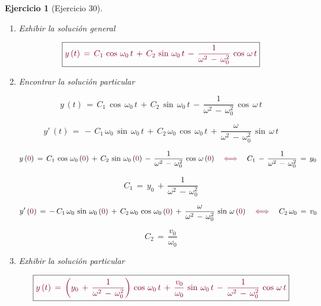 \documentclass[a4paper,11pt, openany]{book}
\newtheorem{ejer}{Ejercicio}[section]
\newcommand*{\itembolasazules}[1]{%
\footnotesize\protect\tikz[baseline=-3pt]%
\protect\node[scale=.7, circle, shade, ball
color=green]{\color{white}\Large\bf#1};}
\begin{document}
\begin{ejer}[Ejercicio 30]
\begin{enumerate}[label=\itembolasazules{\arabic*}]
\item Exhibir la solución general
 
$$\boxed{\textcolor{burgundy}{y\,(t)\,=\,C_{1}\,\cos\,\omega_{0}\,t\,+\,C_{2}\,\sin\,\omega_{0}\,t\,-\,\dfrac{1}{\omega^{2}\,-\,\omega_{0}^{2}}\,\cos\,\omega\,t }} $$
 
\item Encontrar la solución particular
 
$$y\,(t)\,=\,C_{1}\,\cos\,\omega_{0}\,t\,+\,C_{2}\,\sin\,\omega_{0}\,t\,-\,\dfrac{1}{\omega^{2}\,-\,\omega_{0}^{2}}\,\cos\,\omega\,t $$
 
$$y'\,(t)\,=\,-\,C_{1}\,\omega_{0}\,\sin\,\omega_{0}\,t\,+\,C_{2}\,\omega_{0}\,\cos\,\omega_{0}\,t\,+\,\dfrac{\omega}{\omega^{2}\,-\,\omega_{0}^{2}}\,\sin\,\omega\,t $$
 
$$y\,(\textcolor{burgundy}{0})\,=\,C_{1}\,\cos\,\omega_{0}\,(\textcolor{burgundy}{0})\,+\,C_{2}\,\sin\,\omega_{0}\,(\textcolor{burgundy}{0})\,-\,\dfrac{1}{\omega^{2}\,-\,\omega_{0}^{2}}\,\cos\,\omega\,(\textcolor{burgundy}{0}) \quad \textcolor{burgundy}{\iff} \quad C_{1}\,-\,\dfrac{1}{\omega^{2}\,-\,\omega_{0}^{2}}\,=\,y_{0}$$
 
$$\boxed{C_{1}\,=\,y_{0}\,+\,\dfrac{1}{\omega^{2}\,-\,\omega_{0}^{2}} }$$
 
$$y'\,(\textcolor{burgundy}{0})\,=\,-\,C_{1}\,\omega_{0}\,\sin\,\omega_{0}\,(\textcolor{burgundy}{0})\,+\,C_{2}\,\omega_{0}\,\cos\,\omega_{0}\,(\textcolor{burgundy}{0})\,+\,\dfrac{\omega}{\omega^{2}\,-\,\omega_{0}^{2}}\,\sin\,\omega\,(\textcolor{burgundy}{0}) \quad \textcolor{burgundy}{\iff} \quad C_{2}\,\omega_{0}\,=\,v_{0}$$
 
$$\boxed{C_{2}\,=\,\dfrac{v_{0}}{\omega_{0}} }$$
 
\item Exhibir la solución particular
 
$$\boxed{\textcolor{burgundy}{y\,(t)\,=\,\left(y_{0}\,+\,\dfrac{1}{\omega^{2}\,-\,\omega_{0}^{2}} \right)\,\cos\,\omega_{0}\,t\,+\,\dfrac{v_{0}}{\omega_{0}}\,\sin\,\omega_{0}\,t\,-\,\dfrac{1}{\omega^{2}\,-\,\omega_{0}^{2}}\,\cos\,\omega\,t }} $$

\end{enumerate}

\end{ejer}
 
\end{document}
